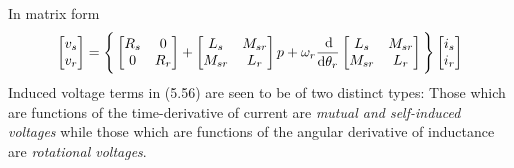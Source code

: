 \documentclass[a4paper,numbers=noenddot,12pt]{scrbook}
\begin{document}
In matrix form
\begin{equation}
    \begin{bmatrix}
        v_s \\ v_r
    \end{bmatrix} 
    = \Bigg\{
        \begin{bmatrix}
            R_s  & 0 \\ 0 & R_r 
        \end{bmatrix}
        +
        \begin{bmatrix}
            L_s  & M_{sr} \\ M_{sr} & L_r 
        \end{bmatrix} 
        p + \omega_r \frac{\dif}{\dif \theta_r} 
        \begin{bmatrix}
            L_s  & M_{sr} \\ M_{sr} & L_r 
        \end{bmatrix}
    \Bigg \}
    \begin{bmatrix}
        i_s \\ i_r 
    \end{bmatrix}
\end{equation}
Induced voltage terms in (5.56) are seen to be of two distinct types: Those which are functions of the time-derivative of current are \emph{mutual and self-induced voltages} while those which are functions of the angular derivative of inductance are \emph{rotational voltages}.
\end{document}
